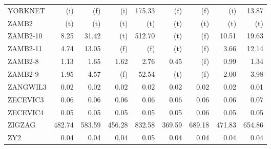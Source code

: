 \documentclass[11pt,twoside]{article}
\begin{document}
{\begin{longtable}[c]{|l|r|r|r|r|r|r|r|r|}
YORKNET & (i) & (f) & (i) & 175.33 & (f) & (f) & (i) & 13.87 \\
ZAMB2 & (t) & (t) & (t) & (t) & (t) & (t) & (t) & (t) \\
ZAMB2-10 & 8.25 & 31.42 & (t) & 512.70 & (t) & (f) & 10.51 & 19.63 \\
ZAMB2-11 & 4.74 & 13.05 & (f) & (f) & (t) & (f) & 3.66 & 12.14 \\
ZAMB2-8 & 1.13 & 1.65 & 1.62 & 2.76 & 0.45 & (f) & 0.99 & 1.34 \\
ZAMB2-9 & 1.95 & 4.57 & (f) & 52.54 & (t) & (f) & 2.00 & 3.98 \\
ZANGWIL3 & 0.02 & 0.02 & 0.02 & 0.02 & 0.02 & 0.02 & 0.02 & 0.01 \\
ZECEVIC3 & 0.06 & 0.06 & 0.06 & 0.06 & 0.06 & 0.06 & 0.06 & 0.07 \\
ZECEVIC4 & 0.05 & 0.05 & 0.05 & 0.05 & 0.05 & 0.06 & 0.05 & 0.05 \\
ZIGZAG & 482.74 & 583.59 & 456.28 & 832.58 & 369.59 & 689.18 & 471.83 & 654.86 \\
ZY2 & 0.04 & 0.04 & 0.04 & 0.05 & 0.04 & 0.04 & 0.04 & 0.04 \\
\end{longtable}
}

\newpage
\end{document}
